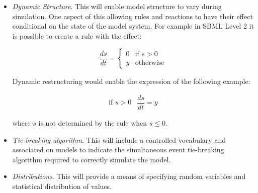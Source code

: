 \begin{itemize}
\item \emph{Dynamic Structure}.  This will enable model structure
  to vary during simulation.  One aspect of this allowing rules
  and reactions to have their effect conditional on the state of
  the model system.  For example in SBML Level 2 it is possible to
  create a rule with the effect:
\begin{linenomath}
\begin{equation*}
\frac{d s}{d t} =
\left\{
\begin{array}{ll}
     0 & \mbox{if $s>0$}\\
     y & \mbox{otherwise}
\end{array}
\right.
\end{equation*}
\end{linenomath}
Dynamic restructuring would enable the expression of the following example:
\begin{linenomath}
\begin{equation*}
\begin{array}{ll}
\mbox{if $s>0$} & \dfrac{d s}{d t} = y
\end{array}
\end{equation*}
\end{linenomath}
where $s$ is not determined by the rule when $s \leq 0$.

\item \emph{Tie-breaking algorithm}.  This will include a
  controlled vocabulary and associated  on models to
  indicate the simultaneous event tie-breaking algorithm required
  to correctly simulate the model.
  
\item \emph{Distributions}.  This will provide a means of
  specifying random variables and statistical distribution of
  values.

\end{itemize}




